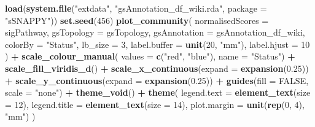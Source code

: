 \documentclass[9pt,a4paper,]{extarticle}
\newenvironment{Shaded}{\begin{snugshade}}{\end{snugshade}}
\newcommand{\AttributeTok}[1]{\textcolor[rgb]{0.13,0.29,0.53}{#1}}
\newcommand{\ConstantTok}[1]{\textcolor[rgb]{0.56,0.35,0.01}{#1}}
\newcommand{\DecValTok}[1]{\textcolor[rgb]{0.00,0.00,0.81}{#1}}
\newcommand{\FloatTok}[1]{\textcolor[rgb]{0.00,0.00,0.81}{#1}}
\newcommand{\FunctionTok}[1]{\textcolor[rgb]{0.13,0.29,0.53}{\textbf{#1}}}
\newcommand{\NormalTok}[1]{#1}
\newcommand{\SpecialCharTok}[1]{\textcolor[rgb]{0.81,0.36,0.00}{\textbf{#1}}}
\newcommand{\StringTok}[1]{\textcolor[rgb]{0.31,0.60,0.02}{#1}}
\begin{document}
\begin{Shaded}
\begin{Highlighting}[]
\FunctionTok{load}\NormalTok{(}\FunctionTok{system.file}\NormalTok{(}\StringTok{"extdata"}\NormalTok{, }\StringTok{"gsAnnotation\_df\_wiki.rda"}\NormalTok{, }\AttributeTok{package =} \StringTok{"sSNAPPY"}\NormalTok{))}
\FunctionTok{set.seed}\NormalTok{(}\DecValTok{456}\NormalTok{)}
\FunctionTok{plot\_community}\NormalTok{(}
    \AttributeTok{normalisedScores =}\NormalTok{ sigPathway,}
    \AttributeTok{gsTopology =}\NormalTok{ gsTopology, }
    \AttributeTok{gsAnnotation =}\NormalTok{ gsAnnotation\_df\_wiki,}
    \AttributeTok{colorBy =} \StringTok{"Status"}\NormalTok{,}
    \AttributeTok{lb\_size =} \DecValTok{3}\NormalTok{, }
    \AttributeTok{label.buffer =} \FunctionTok{unit}\NormalTok{(}\DecValTok{20}\NormalTok{, }\StringTok{"mm"}\NormalTok{), }
    \AttributeTok{label.hjust =} \DecValTok{10}
\NormalTok{) }\SpecialCharTok{+}
    \FunctionTok{scale\_colour\_manual}\NormalTok{(}
        \AttributeTok{values =} \FunctionTok{c}\NormalTok{(}\StringTok{"red"}\NormalTok{, }\StringTok{"blue"}\NormalTok{), }
        \AttributeTok{name =} \StringTok{"Status"}\NormalTok{) }\SpecialCharTok{+}
    \FunctionTok{scale\_fill\_viridis\_d}\NormalTok{() }\SpecialCharTok{+}
    \FunctionTok{scale\_x\_continuous}\NormalTok{(}\AttributeTok{expand =} \FunctionTok{expansion}\NormalTok{(}\FloatTok{0.25}\NormalTok{)) }\SpecialCharTok{+}
    \FunctionTok{scale\_y\_continuous}\NormalTok{(}\AttributeTok{expand =} \FunctionTok{expansion}\NormalTok{(}\FloatTok{0.25}\NormalTok{)) }\SpecialCharTok{+}
    \FunctionTok{guides}\NormalTok{(}\AttributeTok{fill =} \ConstantTok{FALSE}\NormalTok{, }\AttributeTok{scale =} \StringTok{"none"}\NormalTok{) }\SpecialCharTok{+}
    \FunctionTok{theme\_void}\NormalTok{() }\SpecialCharTok{+}
    \FunctionTok{theme}\NormalTok{(}
        \AttributeTok{legend.text =} \FunctionTok{element\_text}\NormalTok{(}\AttributeTok{size =} \DecValTok{12}\NormalTok{),}
        \AttributeTok{legend.title =} \FunctionTok{element\_text}\NormalTok{(}\AttributeTok{size =} \DecValTok{14}\NormalTok{),}
        \AttributeTok{plot.margin =} \FunctionTok{unit}\NormalTok{(}\FunctionTok{rep}\NormalTok{(}\DecValTok{0}\NormalTok{, }\DecValTok{4}\NormalTok{), }\StringTok{"mm"}\NormalTok{)}
\NormalTok{    )}
\end{Highlighting}
\end{Shaded}
\end{document}
